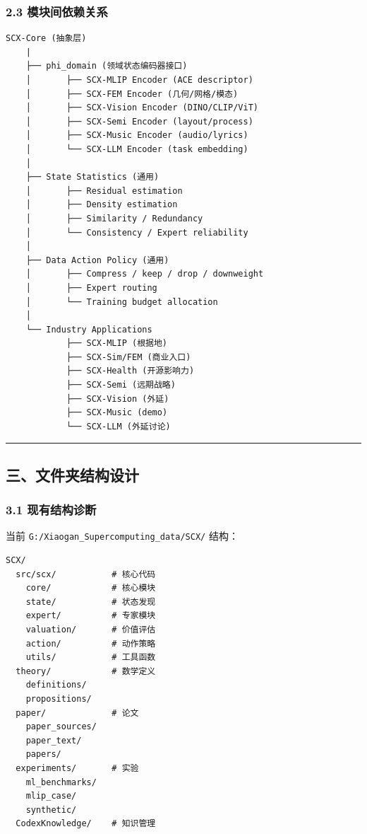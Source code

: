 \documentclass[
  12pt,
]{ctexart}
\begin{document}
\subsubsection{2.3
模块间依赖关系}\label{ux6a21ux5757ux95f4ux4f9dux8d56ux5173ux7cfb}

\begin{verbatim}
SCX-Core (抽象层)
    |
    ├── phi_domain (领域状态编码器接口)
    │       ├── SCX-MLIP Encoder (ACE descriptor)
    │       ├── SCX-FEM Encoder (几何/网格/模态)
    │       ├── SCX-Vision Encoder (DINO/CLIP/ViT)
    │       ├── SCX-Semi Encoder (layout/process)
    │       ├── SCX-Music Encoder (audio/lyrics)
    │       └── SCX-LLM Encoder (task embedding)
    │
    ├── State Statistics (通用)
    │       ├── Residual estimation
    │       ├── Density estimation
    │       ├── Similarity / Redundancy
    │       └── Consistency / Expert reliability
    │
    ├── Data Action Policy (通用)
    │       ├── Compress / keep / drop / downweight
    │       ├── Expert routing
    │       └── Training budget allocation
    │
    └── Industry Applications
            ├── SCX-MLIP (根据地)
            ├── SCX-Sim/FEM (商业入口)
            ├── SCX-Health (开源影响力)
            ├── SCX-Semi (远期战略)
            ├── SCX-Vision (外延)
            ├── SCX-Music (demo)
            └── SCX-LLM (外延讨论)
\end{verbatim}

\begin{center}\rule{0.5\linewidth}{0.5pt}\end{center}

\subsection{三、文件夹结构设计}\label{ux4e09ux6587ux4ef6ux5939ux7ed3ux6784ux8bbeux8ba1}

\subsubsection{3.1
现有结构诊断}\label{ux73b0ux6709ux7ed3ux6784ux8bcaux65ad}

当前 \texttt{G:/Xiaogan\_Supercomputing\_data/SCX/} 结构：

\begin{verbatim}
SCX/
  src/scx/           # 核心代码
    core/            # 核心模块
    state/           # 状态发现
    expert/          # 专家模块
    valuation/       # 价值评估
    action/          # 动作策略
    utils/           # 工具函数
  theory/            # 数学定义
    definitions/
    propositions/
  paper/             # 论文
    paper_sources/
    paper_text/
    papers/
  experiments/       # 实验
    ml_benchmarks/
    mlip_case/
    synthetic/
  CodexKnowledge/    # 知识管理
\end{verbatim}
\end{document}
